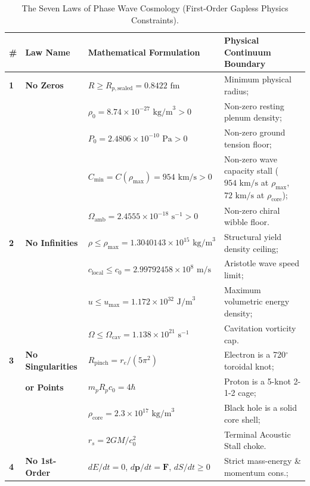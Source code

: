 \documentclass[11pt,a4paper]{article}
\begin{document}
\begin{table}[!htbp]
\centering
\caption{The Seven Laws of Phase Wave Cosmology (First-Order Gapless Physics Constraints).}
\label{tab:seven_laws}
\footnotesize
\setlength{\tabcolsep}{4pt}
\renewcommand{\arraystretch}{1.18}
\begin{tabularx}{\textwidth}{C{0.6cm} L{2.8cm} L{5.2cm} Y}
\toprule
\textbf{\#} & \textbf{Law Name} & \textbf{Mathematical Formulation} & \textbf{Physical Continuum Boundary} \\
\midrule
\textbf{1} & \textbf{No Zeros} & $R \ge R_{p,\text{sealed}} = 0.8422\text{ fm}$ & Minimum physical radius; \\
& & $\rho_0 = 8.74 \times 10^{-27}\text{ kg/m}^3 > 0$ & Non-zero resting plenum density; \\
& & $P_0 = 2.4806 \times 10^{-10}\text{ Pa} > 0$ & Non-zero ground tension floor; \\
& & $C_{\min} = C(\rho_{\max}) = 954\text{ km/s} > 0$ & Non-zero wave capacity stall ($954\text{ km/s}$ at $\rho_{\max}$, $72\text{ km/s}$ at $\rho_{\text{core}}$); \\
& & $\Omega_{\text{amb}} = 2.4555 \times 10^{-18}\text{ s}^{-1} > 0$ & Non-zero chiral wibble floor. \\
\midrule
\textbf{2} & \textbf{No Infinities} & $\rho \le \rho_{\max} = 1.3040143 \times 10^{15}\text{ kg/m}^3$ & Structural yield density ceiling; \\
& & $c_{\text{local}} \le c_0 = 2.99792458 \times 10^8\text{ m/s}$ & Aristotle wave speed limit; \\
& & $u \le u_{\max} = 1.172 \times 10^{32}\text{ J/m}^3$ & Maximum volumetric energy density; \\
& & $\Omega \le \Omega_{\text{cav}} = 1.138 \times 10^{21}\text{ s}^{-1}$ & Cavitation vorticity cap. \\
\midrule
\textbf{3} & \textbf{No Singularities} & $R_{\text{pinch}} = r_e / (5\pi^2)$ & Electron is a 720$^\circ$ toroidal knot; \\
& \textbf{or Points} & $m_p R_p c_0 = 4\hbar$ & Proton is a 5-knot 2-1-2 cage; \\
& & $\rho_{\text{core}} = 2.3 \times 10^{17}\text{ kg/m}^3$ & Black hole is a solid core shell; \\
& & $r_s = 2GM/c_0^2$ & Terminal Acoustic Stall choke. \\
\midrule
\textbf{4} & \textbf{No 1st-Order} & $dE/dt = 0$, $d\mathbf{p}/dt = \mathbf{F}$, $dS/dt \ge 0$ & Strict mass-energy \& momentum cons.; \\

\end{tabularx}
\end{table}
\end{document}

